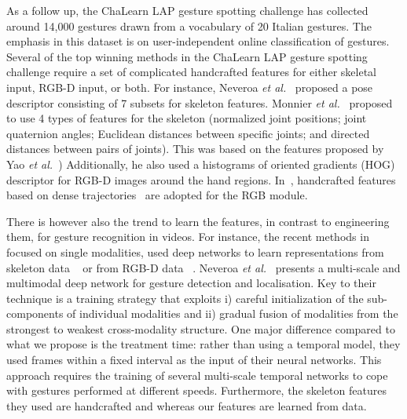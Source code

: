 As a follow up, the ChaLearn LAP \cite{chalearnLAP} gesture spotting challenge has collected around 14,000 gestures drawn from a vocabulary of 20 Italian gestures. The emphasis in this dataset is on user-independent online classification of gestures. Several of the top winning methods in the ChaLearn LAP gesture spotting challenge require a set of complicated handcrafted features for either skeletal input, RGB-D input, or both.
For instance, Neveroa \emph{et al.}~\cite{neverova2014multi} proposed a pose descriptor consisting of 7 subsets for skeleton features. Monnier \emph{et al.}~\cite{Monnier2014multi} proposed to use 4 types of features for the skeleton (normalized joint positions; joint quaternion angles; Euclidean distances between specific joints; and directed distances between pairs of joints). This was based on the features proposed by Yao \emph{et al.}~\cite{yao2011does}) Additionally, he also used a histograms of oriented gradients (HOG) descriptor for RGB-D images around the hand regions.
In~\cite{Peng2014multi}, handcrafted features based on dense trajectories~\cite{wang2013dense} are adopted for the RGB module. 

There is however also the trend to learn the features, in contrast to engineering them, for gesture recognition in videos.
%
For instance, the recent methods in \cite{wu2014deep,lio2014deep} focused on single modalities,
used deep networks to learn representations from skeleton data ~\cite{wu2014deep} or from RGB-D data ~\cite{lio2014deep}.
%
Neveroa \emph{et al.}~\cite{neverova2014multi} presents a multi-scale and multimodal deep network for gesture detection and localisation.
Key to their technique is a training strategy that exploits i) careful initialization of the sub-components of individual modalities and ii) gradual fusion of modalities from the strongest to weakest cross-modality structure.
%
One major difference compared to what we propose is the treatment time:
rather than using a temporal model, they used frames within a fixed interval as the input of their neural networks. This approach requires the training of several multi-scale temporal networks  to cope with gestures performed at different speeds.
%
Furthermore, the skeleton features they used are handcrafted and whereas our features are learned from data.

\endinput
